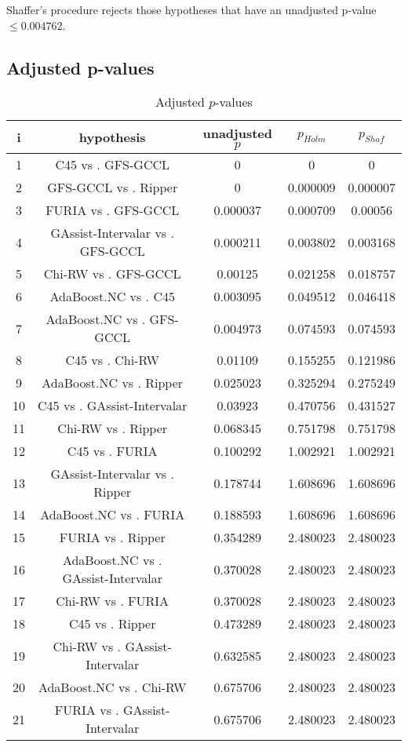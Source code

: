 \documentclass[a4paper,10pt]{article}
\begin{document}
Shaffer's procedure rejects those hypotheses that have an unadjusted p-value $\le0.004762$.

\pagebreak

\subsection{Adjusted p-values}

\begin{table}[!htp]
\centering\scriptsize
\begin{tabular}{ccccc}
i&hypothesis&unadjusted $p$&$p_{Holm}$&$p_{Shaf}$\\
\hline1& C45  vs . GFS-GCCL &0&0&0\\
2& GFS-GCCL  vs . Ripper&0&0.000009&0.000007\\
3& FURIA  vs . GFS-GCCL &0.000037&0.000709&0.00056\\
4& GAssist-Intervalar  vs . GFS-GCCL &0.000211&0.003802&0.003168\\
5& Chi-RW  vs . GFS-GCCL &0.00125&0.021258&0.018757\\
6& AdaBoost.NC  vs . C45 &0.003095&0.049512&0.046418\\
7& AdaBoost.NC  vs . GFS-GCCL &0.004973&0.074593&0.074593\\
8& C45  vs . Chi-RW &0.01109&0.155255&0.121986\\
9& AdaBoost.NC  vs . Ripper&0.025023&0.325294&0.275249\\
10& C45  vs . GAssist-Intervalar &0.03923&0.470756&0.431527\\
11& Chi-RW  vs . Ripper&0.068345&0.751798&0.751798\\
12& C45  vs . FURIA &0.100292&1.002921&1.002921\\
13& GAssist-Intervalar  vs . Ripper&0.178744&1.608696&1.608696\\
14& AdaBoost.NC  vs . FURIA &0.188593&1.608696&1.608696\\
15& FURIA  vs . Ripper&0.354289&2.480023&2.480023\\
16& AdaBoost.NC  vs . GAssist-Intervalar &0.370028&2.480023&2.480023\\
17& Chi-RW  vs . FURIA &0.370028&2.480023&2.480023\\
18& C45  vs . Ripper&0.473289&2.480023&2.480023\\
19& Chi-RW  vs . GAssist-Intervalar &0.632585&2.480023&2.480023\\
20& AdaBoost.NC  vs . Chi-RW &0.675706&2.480023&2.480023\\
21& FURIA  vs . GAssist-Intervalar &0.675706&2.480023&2.480023\\
\hline
\end{tabular}
\caption{Adjusted $p$-values}
\end{table}
\end{document}

